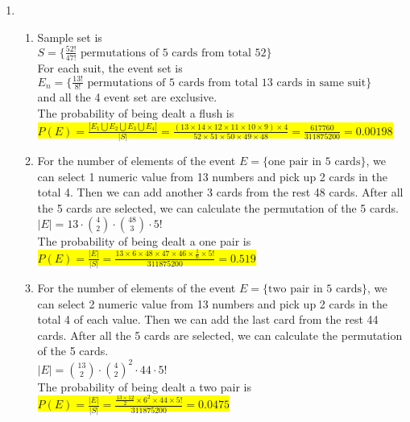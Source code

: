 \documentclass{article}
\begin{document}
\begin{enumerate}
	\item
	\begin{enumerate}
		\item
		\mysolu
		Sample set is\\
		${S=\{{\frac{52!}{47!}}\text{ permutations of 5 cards from total 52}\}}$\\
		
		For each suit, the event set is\\
		${E_n=\{{\frac{13!}{8!}}\text{ permutations of 5 cards from total 13 cards in same suit}\}}$\\
		and all the 4 event set are exclusive.\\
		\myansw
		The probability of being dealt a flush is\\
		\colorbox{yellow}{
			${
				P(E)=\frac{|E_1\bigcup E_2\bigcup E_3\bigcup E_4|}{|S|} = \frac{(13\times14\times12\times11\times10\times9)\times4}{52\times51\times50\times49\times48}=\frac{617760}{311875200}=0.00198
			}$
		}\\
		
		\item
		\mysolu
		For the number of elements of the event ${E=\{\text{one pair in 5 cards}\}}$, we can select 1 numeric value from 13 numbers and pick up 2 cards in the total 4. Then we can add another 3 cards from the rest 48 cards. After all the 5 cards are selected, we can calculate the permutation of the 5 cards.\\
		${|E|=13\cdot{4 \choose 2}\cdot{48 \choose 3} \cdot 5!}$\\
		\myansw
		The probability of being dealt a one pair is\\
		\colorbox{yellow}{
			${P(E)=\frac{|E|}{|S|}=\frac{13\times6\times48\times47\times46\times \frac{1}{6} \times 5!}{311875200}=0.519}$
		}\\
	
		\item
		\mysolu
		For the number of elements of the event ${E=\{\text{two pair in 5 cards}\}}$, we can select 2 numeric value from 13 numbers and pick up 2 cards in the total 4 of each value. Then we can add the last card from the rest 44 cards. After all the 5 cards are selected, we can calculate the permutation of the 5 cards.\\
		${|E|={13 \choose 2}\cdot{4 \choose 2}^2 \cdot44\cdot 5!}$\\
		\myansw
		The probability of being dealt a two pair is\\
		\colorbox{yellow}{
			${P(E)=\frac{|E|}{|S|}=\frac{\frac{13\times12}{2}\times6^2\times44\times 5!}{311875200}=0.0475}$
		}\\
	

\end{enumerate}
\end{enumerate}
\end{document}
